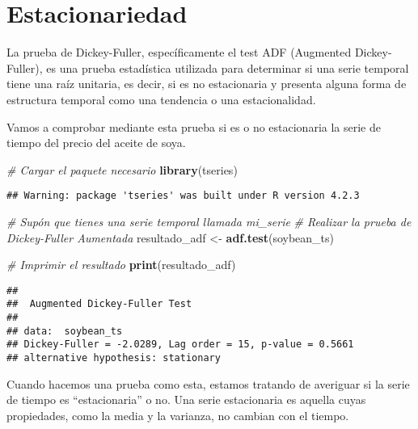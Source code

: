 \documentclass[
]{book}
\newenvironment{Shaded}{\begin{snugshade}}{\end{snugshade}}
\newcommand{\CommentTok}[1]{\textcolor[rgb]{0.56,0.35,0.01}{\textit{#1}}}
\newcommand{\FunctionTok}[1]{\textcolor[rgb]{0.13,0.29,0.53}{\textbf{#1}}}
\newcommand{\NormalTok}[1]{#1}
\newcommand{\OtherTok}[1]{\textcolor[rgb]{0.56,0.35,0.01}{#1}}
\begin{document}
\hypertarget{estacionariedad}{%
\chapter{Estacionariedad}\label{estacionariedad}}

La prueba de Dickey-Fuller, específicamente el test ADF (Augmented Dickey-Fuller), es una prueba estadística utilizada para determinar si una serie temporal tiene una raíz unitaria, es decir, si es no estacionaria y presenta alguna forma de estructura temporal como una tendencia o una estacionalidad.

Vamos a comprobar mediante esta prueba si es o no estacionaria la serie de tiempo del precio del aceite de soya.

\begin{Shaded}
\begin{Highlighting}[]
\CommentTok{\# Cargar el paquete necesario}
\FunctionTok{library}\NormalTok{(tseries)}
\end{Highlighting}
\end{Shaded}

\begin{verbatim}
## Warning: package 'tseries' was built under R version 4.2.3
\end{verbatim}

\begin{Shaded}
\begin{Highlighting}[]
\CommentTok{\# Supón que tienes una serie temporal llamada \textquotesingle{}mi\_serie\textquotesingle{}}
\CommentTok{\# Realizar la prueba de Dickey{-}Fuller Aumentada}
\NormalTok{resultado\_adf }\OtherTok{\textless{}{-}} \FunctionTok{adf.test}\NormalTok{(soybean\_ts)}

\CommentTok{\# Imprimir el resultado}
\FunctionTok{print}\NormalTok{(resultado\_adf)}
\end{Highlighting}
\end{Shaded}

\begin{verbatim}
## 
##  Augmented Dickey-Fuller Test
## 
## data:  soybean_ts
## Dickey-Fuller = -2.0289, Lag order = 15, p-value = 0.5661
## alternative hypothesis: stationary
\end{verbatim}

Cuando hacemos una prueba como esta, estamos tratando de averiguar si la serie de tiempo es ``estacionaria'' o no. Una serie estacionaria es aquella cuyas propiedades, como la media y la varianza, no cambian con el tiempo.
\end{document}

